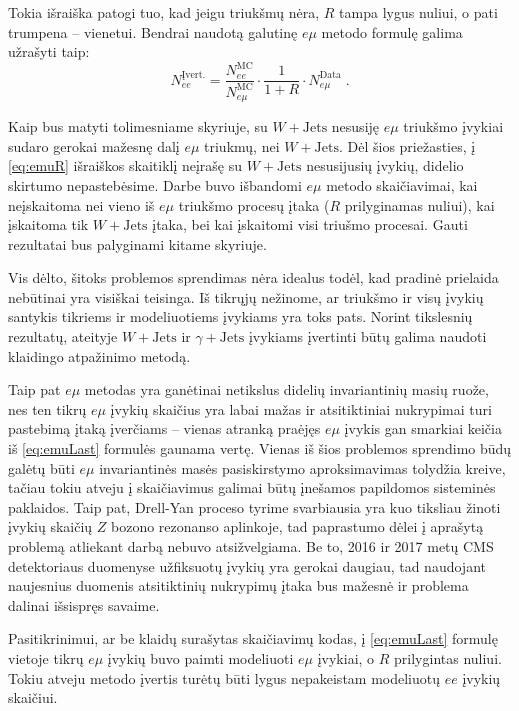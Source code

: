 \documentclass[a4paper, 12pt]{article}
\newcommand{\gJets}{\gamma\! +\!\mathrm{Jets}}
\newcommand{\WJets}{W\! +\!\mathrm{Jets}}
\newlength\q
\begin{document}
Tokia išraiška patogi tuo, kad jeigu triukšmų nėra, $R$ tampa lygus nuliui, o pati trumpena -- vienetui. Bendrai naudotą galutinę $e\mu$ metodo formulę galima užrašyti taip:
\begin{equation}
N_{ee}^{\mathrm{Įvert.}}=\frac{N_{ee}^{\mathrm{MC}}}{N_{e\mu}^{\mathrm{MC}}}\cdot \frac{1}{1+R} \cdot N_{e\mu}^{\mathrm{Data}} \; .
\label{eq:emuLast}
\end{equation}

Kaip bus matyti tolimesniame skyriuje, su $\WJets$ nesusiję $e\mu$ triukšmo įvykiai sudaro gerokai mažesnę dalį $e\mu$ triukmų, nei $\WJets$. Dėl šios priežasties, į \eqref{eq:emuR} išraiškos skaitiklį neįrašę su $\WJets$ nesusijusių įvykių, didelio skirtumo nepastebėsime. Darbe buvo išbandomi $e\mu$ metodo skaičiavimai, kai neįskaitoma nei vieno iš $e\mu$ triukšmo procesų įtaka ($R$ prilyginamas nuliui), kai įskaitoma tik $\WJets$ įtaka, bei kai įskaitomi visi triušmo procesai. Gauti rezultatai bus palyginami kitame skyriuje.

Vis dėlto, šitoks problemos sprendimas nėra idealus todėl, kad pradinė prielaida nebūtinai yra visiškai teisinga. Iš tikrųjų nežinome, ar triukšmo ir visų įvykių santykis tikriems ir modeliuotiems įvykiams yra toks pats. Norint tikslesnių rezultatų, ateityje $\WJets$ ir $\gJets$ įvykiams įvertinti būtų galima naudoti klaidingo atpažinimo metodą.

Taip pat $e\mu$ metodas yra ganėtinai netikslus didelių invariantinių masių ruože, nes ten tikrų $e\mu$ įvykių skaičius yra labai mažas ir atsitiktiniai nukrypimai turi pastebimą įtaką įverčiams -- vienas atranką praėjęs $e\mu$ įvykis gan smarkiai keičia iš \eqref{eq:emuLast} formulės gaunama vertę. Vienas iš šios problemos sprendimo būdų galėtų būti $e\mu$ invariantinės masės pasiskirstymo aproksimavimas tolydžia kreive, tačiau tokiu atveju į skaičiavimus galimai būtų įnešamos papildomos sisteminės paklaidos. Taip pat, Drell-Yan proceso tyrime svarbiausia yra kuo tiksliau žinoti įvykių skaičių $Z$ bozono rezonanso aplinkoje, tad paprastumo dėlei į aprašytą problemą atliekant darbą nebuvo atsižvelgiama. Be to, 2016 ir 2017 metų CMS detektoriaus duomenyse užfiksuotų įvykių yra gerokai daugiau, tad naudojant naujesnius duomenis atsitiktinių nukrypimų įtaka bus mažesnė ir problema dalinai išsispręs savaime.

Pasitikrinimui, ar be klaidų surašytas skaičiavimų kodas, į \ref{eq:emuLast} formulę vietoje tikrų $e\mu$ įvykių buvo paimti modeliuoti $e\mu$ įvykiai, o $R$ prilygintas nuliui. Tokiu atveju metodo įvertis turėtų būti lygus nepakeistam modeliuotų $ee$ įvykių skaičiui.
\end{document}
